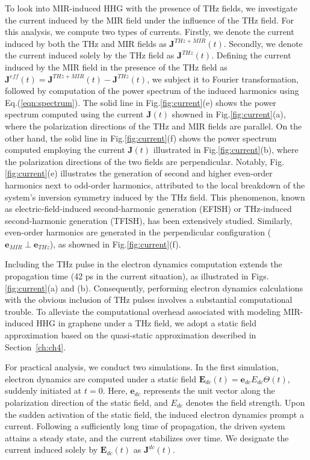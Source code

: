 To look into MIR-induced \gls{HHG} with the presence of THz fields, we investigate the current induced by the MIR field under the influence of the THz field. For this analysis, we compute two types of currents. Firstly, we denote the current induced by both the THz and MIR fields as $\mathbf J^{THz + MIR}(t)$. Secondly, we denote the current induced solely by the THz field as $\mathbf J^{THz}(t)$. Defining the current induced by the MIR field in the presence of the THz field as $\mathbf J^{eff}(t) = \mathbf J^{THz + MIR}(t) - \mathbf J^{THz}(t)$, we subject it to Fourier transformation, followed by computation of the power spectrum of the induced harmonics using Eq.(\ref{eqn:spectrum}). The solid line in Fig.\ref{fig:current}(e) shows the power spectrum computed using the current $\mathbf J(t)$ showned in Fig.\ref{fig:current}(a), where the polarization directions of the THz and MIR fields are parallel. On the other hand, the solid line in Fig.\ref{fig:current}(f) shows the power spectrum computed employing the current $\mathbf J(t)$ illustrated in Fig.\ref{fig:current}(b), where the polarization directions of the two fields are perpendicular. Notably, Fig.\ref{fig:current}(e) illustrates the generation of second and higher even-order harmonics next to odd-order harmonics, attributed to the local breakdown of the system's inversion symmetry induced by the THz field. This phenomenon, known as electric-field-induced second-harmonic generation (EFISH) or THz-induced second-harmonic generation (TFISH), has been extensively studied\cite{PhysRevLett.8.404,PhysRev.137.A801,Nahata:98,COOK1999221}. Similarly, even-order harmonics are generated in the perpendicular configuration ($\mathbf e_{MIR} \perp \mathbf e_{THz}$), as showned in Fig.\ref{fig:current}(f).

Including the THz pulse in the electron dynamics computation extends the propagation time (42 ps in the current situation), as illustrated in Figs.\ref{fig:current}(a) and (b). Consequently, performing electron dynamics calculations with the obvious inclusion of THz pulses involves a substantial computational trouble. To alleviate the computational overhead associated with modeling MIR-induced \gls{HHG} in graphene under a THz field, we adopt a static field approximation based on the quasi-static approximation described in Section~\ref{ch:ch4}.

For practical analysis, we conduct two simulations. In the first simulation, electron dynamics are computed under a static field $\mathbf E_{dc}(t) = \mathbf e_{dc} E_{dc}\Theta(t)$, suddenly initiated at $t=0$. Here, $\mathbf e_{dc}$ represents the unit vector along the polarization direction of the static field, and $E_{dc}$ denotes the field strength. Upon the sudden activation of the static field, the induced electron dynamics prompt a current. Following a sufficiently long time of propagation, the driven system attains a steady state, and the current stabilizes over time. We designate the current induced solely by $\mathbf E_{dc}(t)$ as $\mathbf J^{dc}(t)$.

